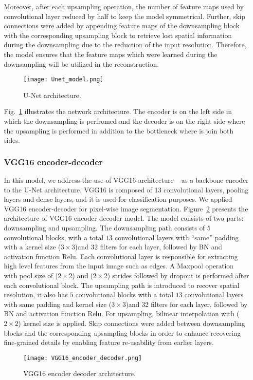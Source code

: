 Moreover, after each upsampling operation, the number of feature maps used by convolutional layer reduced by half to keep the model symmetrical. 
Further, skip connections were added by appending feature maps of the downsampling block with the corresponding upsampling block to retrieve lost spatial information during the downsampling due to the reduction of the input resolution.
Therefore, the model ensures that the feature maps which were learned during the downsampling will be utilized in the reconstruction. 
\begin{figure} [h!]
	\begin{center}
		\texttt{[image: Unet\_model.png]}
	\end{center}
	\caption{U-Net architecture.} 
	\label{fig:Unet}
\end{figure}
Fig.~\ref{fig:Unet}  illustrates the network architecture. 
The encoder is on the left side in which the downsampling is perfromed and the decoder is on the right side where the upsampling is performed in addition to the bottleneck where is join both sides.
\subsubsection{VGG16 encoder-decoder}
In this model, we address the use of VGG16 architecture  ~\cite{simonyan2014very} as a backbone encoder to the U-Net architecture.
VGG16 is composed of 13 convolutional layers, pooling layers and dense layers, and it is used for classification purposes. 
We applied VGG16 encoder-decoder for pixel-wise image segmentation.
Figure~\ref{vgg16} presents the architecture of VGG16 encoder-decoder model. 
The model consists of two parts: downsampling and upsampling.
The downsampling path consists of \(5\) convolutional blocks,  with a total \(13\) convolutional layers  with \enquote{same} padding with a kernel size (\(3\times3\))and 32 filters for each layer, followed by BN and activation function Relu.
Each convolutional layer is responsible for extracting high level features from the input image such as edges.
A Maxpool operation with pool size of (\(2\times2\))  and (\(2\times2\)) strides followed by dropout is performed after each convolutional block. 
The upsampling path is introduced to recover spatial resolution, it also has \(5\) convolutional blocks with a total \(13\) convolutional layers  with same padding and kernel size (\(3\times3\))and 32 filters for each layer, followed by BN and activation function Relu.
For upsampling, bilinear interpolation with (\(2\times2\)) kernel size is applied.
Skip connections were added between downsampling blocks and the corresponding upsampling blocks in order to enhance recovering fine-grained details by enabling feature re-usability from earlier layers.
\begin{figure} [h!]
	\begin{center}
		\texttt{[image: VGG16\_encoder\_decoder.png]}
	\end{center}
	\caption{VGG16 encoder decoder architecture.} 
	\label{vgg16}
\end{figure}

